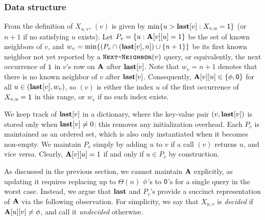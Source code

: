 \subsubsection{Data structure}\label{sec:nn-ds}

From the definition of $X_{u,v}$, $(v)$ is given by $\min\{u > \mathbf{last}[v]: X_{v,u} = \mathsf{1}\}$ (or $n+1$ if no satisfying $u$ exists). Let
$P_v = \{u: \mathbf{A}[v][u]=1\}$ be the set of known neighbors of $v$, and $w_v = \min \{(P_v \cap (\mathbf{last}[v], n]) \cup \{n+1\}\}$ be its first known neighbor not yet reported by a $\texttt{\textsc{Next-Neighbor}}(v)$ query, or equivalently, the next occurrence of $\mathsf{1}$ in $v$'s row on $\mathbf{A}$ after $\mathbf{last}[v]$. Note that $w_v = n+1$ denotes that there is no known neighbor of $v$ after $\mathbf{last}[v]$.
Consequently, $\mathbf{A}[v][u] \in \{\phi,\mathsf{0}\}$ for all $u \in (\mathbf{last}[v], w_v)$, so $(v)$ is
either the index $u$ of the first occurrence of $X_{v,u} = \mathsf{1}$ in this range, or $w_v$ if no such index exists.

We keep track of $\mathbf{last}[v]$ in a dictionary, where the key-value pair $(v,\mathbf{last}[v])$ is stored only when $\mathbf{last}[v] \neq 0$: this removes any initialization overhead.
Each $P_v$ is maintained as an ordered set, which is also only instantiated when it becomes non-empty.
We maintain $P_v$ simply by adding $u$ to $v$ if a call $(v)$ returns $u$, and vice versa. Clearly, $\mathbf{A}[v][u]=1$ if and only if $u \in P_v$ by construction.

As discussed in the previous section, we cannot maintain $\mathbf{A}$ explicitly, as updating it requires replacing up to $\Theta(n)$ $\phi$'s to $\mathsf{0}$'s for a single  query in the worst case. Instead, we argue that $\mathbf{last}$ and $P_v$'s provide a succinct representation of $\mathbf{A}$ via the following observation. For simplicity, we say that $X_{u,v}$ is \emph{decided} if $\mathbf{A}[u][v] \neq \phi$, and call it \emph{undecided} otherwise.

